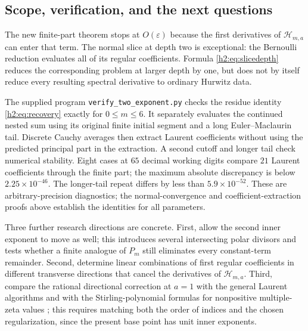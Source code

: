 \subsection{Scope, verification, and the next questions}

The new finite-part theorem stops at $O(\varepsilon)$ because the
first derivatives of $\mathcal H_{m,a}$ can enter that term.
The normal slice at depth two is exceptional: the Bernoulli reduction
evaluates all of its regular coefficients. Formula
\eqref{h2:eq:slicedepth} reduces the corresponding problem at larger
depth by one, but does not by itself reduce every resulting spectral
derivative to ordinary Hurwitz data.

The supplied program \texttt{verify\_two\_exponent.py} checks the
residue identity \eqref{h2:eq:recovery} exactly for $0\le m\le6$.
It separately evaluates the continued nested sum using its original
finite initial segment and a long Euler--Maclaurin tail. Discrete Cauchy
averages then extract Laurent coefficients without using the predicted
principal part in the extraction. A second cutoff and longer tail
check numerical stability. Eight cases at $65$ decimal working digits
compare $21$ Laurent coefficients through the finite part; the maximum
absolute discrepancy is below $2.25\times10^{-46}$. The longer-tail
repeat differs by less than $5.9\times10^{-52}$. These are
arbitrary-precision diagnostics;
the normal-convergence and coefficient-extraction proofs above establish
the identities for all parameters.

Three further research directions are concrete. First, allow the
second inner exponent to move as well; this introduces several
intersecting polar divisors and tests whether a finite analogue of
$P_m$ still eliminates every constant-term remainder. Second, determine
linear combinations of first regular coefficients in different
transverse directions that cancel the derivatives of
$\mathcal H_{m,a}$. Third, compare the rational directional correction
at $a=1$ with the general Laurent algorithms and with the
Stirling-polynomial formulas for nonpositive multiple-zeta values
\cite{h2:MOW,h2:IshiiShinohara}; this requires matching both the order of
indices and the chosen regularization, since the present base point has
unit inner exponents.
